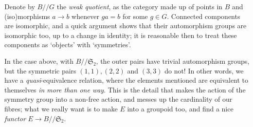 Denote by $B//G$ the \emph{weak quotient}, as the category made up of points in $B$ and (iso)morphisms $a\to b$ whenever $ga=b$ for some $g\in G$. Connected components are isomorphic, and a quick argument shows that their automorphism groups are isomorphic too, up to a change in identity; it is reasonable then to treat these components as `objects' with `symmetries'.

In the case above, with $B//\mathfrak{S}_2$, the outer pairs have trivial automorphism groups, but the symmetric pairs $(1,1), (2,2)$ and $(3,3)$ do not! In other words, we have a \emph{quasi}-equivalence relation, where the elements mentioned are equivalent to themselves \emph{in more than one way}. This is the detail that makes the action of the symmetry group into a non-free action, and messes up the cardinality of our fibres; what we really want is to make $E$ into a groupoid too, and find a nice \emph{functor} $E\to B//\mathfrak{S}_2$.
